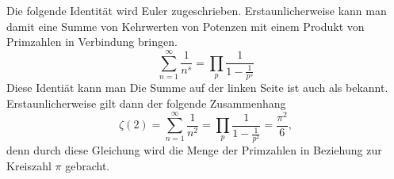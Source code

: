 \begin{example}
Die folgende Identität wird Euler zugeschrieben. Erstaunlicherweise kann man damit eine Summe von Kehrwerten von Potenzen mit einem Produkt von Primzahlen in Verbindung bringen.
\begin{displaymath}
\sum_{n=1}^{\infty}{\frac{1}{n^s}} = \prod_{p} {\frac{1}{1 - \frac{1}{p^s}}}
\end{displaymath}
Diese Identiät kann man 
Die Summe auf der linken Seite ist auch als  bekannt. Erstaunlicherweise gilt dann der folgende Zusammenhang
\begin{displaymath}
\zeta(2) = \sum_{n=1}^{\infty}{\frac{1}{n^2}} = \prod_{p} {\frac{1}{1 - \frac{1}{p^2}}} = \frac{\pi^2}{6},
\end{displaymath}
denn durch diese Gleichung wird die Menge der Primzahlen in Beziehung zur Kreiszahl $\pi$ gebracht.
\end{example}
